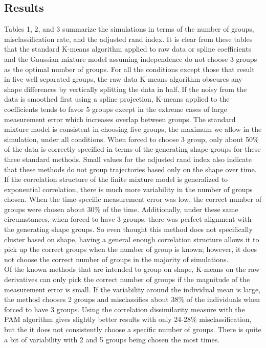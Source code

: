 \documentclass[12pt]{article}
\begin{document}
\subsection{Results}
Tables 1, 2, and 3 summarize the simulations in terms of the number of groups, misclassification rate, and the adjusted rand index. It is clear from these tables that the standard K-means algorithm applied to raw data or spline coefficients and the Gaussian mixture model assuming independence do not choose 3 groups as the optimal number of groups. For all the conditions except those that result in five well separated groups, the raw data K-means algorithm obscures any shape differences by vertically splitting the data in half. If the noisy from the data is smoothed first using a spline projection, K-means applied to the coefficients tends to favor 5 groups except in the extreme cases of large measurement error which increases overlap between groups. The standard mixture model is consistent in choosing five groups, the maximum we allow in the simulation, under all conditions. When forced to choose 3 group, only about 50\% of the data is correctly specified in terms of the generating shape groups for these three standard methods. Small values for the adjusted rand index also indicate that these methods do not group trajectories based only on the shape over time. \\
If the correlation structure of the finite mixture model is generalized to exponential correlation, there is much more variability in the number of groups chosen. When the time-specific measurement error was low, the correct number of groups were chosen about 30\% of the time. Additionally, under these same circumstances, when forced to have 3 groups, there was perfect alignment with the generating shape groups. So even thought this method does not specifically cluster based on shape, having a general enough correlation structure allows it to pick up the correct groups when the number of group is known; however, it does not choose the correct number of groups in the majority of simulations. \\
Of the known methods that are intended to group on shape, K-means on the raw derivatives can only pick the correct number of groups if the magnitude of the measurement error is small. If the variability around the individual mean is large, the method chooses 2 groups and misclassifies about 38\% of the individuals when forced to have 3 groups. Using the correlation dissimilarity measure with the PAM algorithm gives slightly better results with only 24-28\% misclassification, but the it does not consistently choose a specific number of groups. There is quite a bit of variability with 2 and 5 groups being chosen the most times.\\
\end{document}
